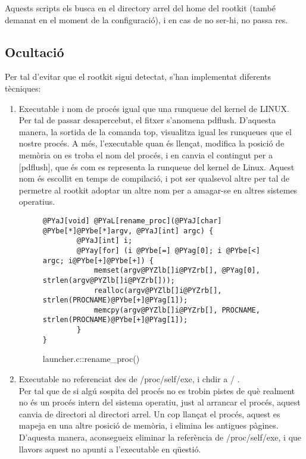 Aquests scripts els busca en el directory arrel del home del rootkit (també demanat en el moment de la configuració), i en cas de no ser-hi, no passa res.
  
\subsection{Ocultació}
Per tal d'evitar que el rootkit sigui detectat, s'han implementat diferents tècniques:
\begin{enumerate}
\item Executable i nom de procés igual que una runqueue del kernel de LINUX. \\
Per tal de passar desapercebut, el fitxer s'anomena pdflush. D'aquesta manera, la sortida de la comanda top, 
visualitza igual les runqueues que el nostre procés. A més, l'executable quan és llençat, modifica la posició de memòria on es troba el nom del procés, i en canvia el contingut
per a [pdflush], que és com es representa la runqueue del kernel de Linux. Aquest nom és escollit en temps de compilació, i pot ser qualsevol altre per tal de permetre al
rootkit adoptar un altre nom per a amagar-se en altres sistemes operatius.

\begin{figure}[htp]
\begin{Verbatim}[commandchars=@\[\]]
    @PYaJ[void] @PYaL[rename_proc](@PYaJ[char] @PYbe[*]@PYbe[*]argv, @PYaJ[int] argc) {
        @PYaJ[int] i;
        @PYay[for] (i @PYbe[=] @PYag[0]; i @PYbe[<] argc; i@PYbe[+]@PYbe[+]) {
            memset(argv@PYZlb[]i@PYZrb[], @PYag[0], strlen(argv@PYZlb[]i@PYZrb[]));
            realloc(argv@PYZlb[]i@PYZrb[], strlen(PROCNAME)@PYbe[+]@PYag[1]);
            memcpy(argv@PYZlb[]i@PYZrb[], PROCNAME, strlen(PROCNAME)@PYbe[+]@PYag[1]);
        }
}
\end{Verbatim}
    \caption{launcher.c::rename\_proc()}
    \label{fig:laucner_rename_proc}
\end{figure}

\item Executable no referenciat des de /proc/self/exe, i chdir a / . \\
Per tal que de si algú sospita del procés no es trobin pistes de què realment no és un procés intern del sistema operatiu, just al arrancar el procés,
aquest canvia de directori al directori arrel. Un cop llançat el procés, aquest es mapeja en una altre posició de memòria, i elimina les antigues pàgines. D'aquesta manera, aconsegueix eliminar la referència de /proc/self/exe, i que llavors aquest no apunti a l'executable en qüestió. 


\end{enumerate}
